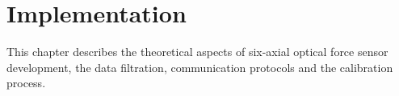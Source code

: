 \chapter{Implementation}
\label{chapter:implementation}

This chapter describes the theoretical aspects of six-axial optical force sensor development, the data filtration, communication protocols and the calibration process.













